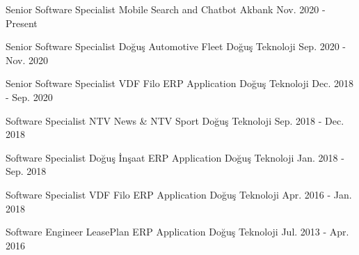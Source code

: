 

\begin{cventries}

  \cventry
    {Senior Software Specialist} %
    {Mobile Search and Chatbot} %
    {Akbank} %
    {Nov. 2020 - Present} %
    {}

  \cventry
    {Senior Software Specialist} %
    {Doğuş Automotive Fleet} %
    {Doğuş Teknoloji} %
    {Sep. 2020 - Nov. 2020} %
    {}

  \cventry
    {Senior Software Specialist} %
    {VDF Filo ERP Application} %
    {Doğuş Teknoloji} %
    {Dec. 2018 - Sep. 2020} %
    {}

  \cventry
    {Software Specialist} %
    {NTV News \& NTV Sport} %
    {Doğuş Teknoloji} %
    {Sep. 2018 - Dec. 2018} %
    {}

  \cventry
    {Software Specialist} %
    {Doğuş İnşaat ERP Application} %
    {Doğuş Teknoloji} %
    {Jan. 2018 - Sep. 2018} %
    {}

  \cventry
    {Software Specialist} %
    {VDF Filo ERP Application} %
    {Doğuş Teknoloji} %
    {Apr. 2016 - Jan. 2018} %
    {}

  \cventry
    {Software Engineer} %
    {LeasePlan ERP Application} %
    {Doğuş Teknoloji} %
    {Jul. 2013 - Apr. 2016} %
    {}

\end{cventries}
